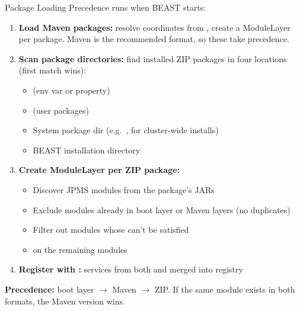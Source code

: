 \begin{frame}{Package Loading Precedence}
\textbf{} runs when BEAST starts:

\vspace{0.5em}
\begin{enumerate}
\item \textbf{Load Maven packages:} resolve coordinates from , create a ModuleLayer per package. Maven is the recommended format, so these take precedence.
\item \textbf{Scan package directories:} find installed ZIP packages in four locations (first match wins):
  \begin{itemize}
  \item {} (env var or  property)
  \item {} (user packages)
  \item System package dir (e.g.\ , for cluster-wide installs)
  \item BEAST installation directory
  \end{itemize}
\item \textbf{Create ModuleLayer per ZIP package:}
  \begin{itemize}
  \item Discover JPMS modules from the package's JARs
  \item Exclude modules already in boot layer or Maven layers (no duplicates)
  \item Filter out modules whose  can't be satisfied
  \item {} on the remaining modules
  \end{itemize}
\item \textbf{Register with :} services from both  and  merged into registry
\end{enumerate}

\vspace{0.3em}
\textbf{Precedence:} boot layer $\to$ Maven $\to$ ZIP.  If the same module exists in both formats, the Maven version wins.
\end{frame}

